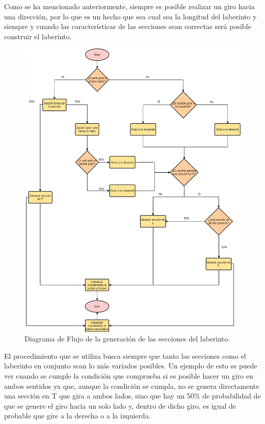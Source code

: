 \documentclass[../main.tex]{subfiles}
\begin{document}
Como se ha mencionado anteriormente, siempre es posible realizar un giro hacia una dirección, por lo que es un hecho que sea cual sea la longitud del laberinto y siempre y cuando las características de las secciones sean correctas será posible construir el laberinto.

\begin{figure}[!p]
\hspace{-1.75cm}
\includegraphics[width=1.3\textwidth]{imagenes/Diagrama_de_Flujo.png}
\caption{Diagrama de Flujo de la generación de las secciones del laberinto.}
\label{fig:Decision_Flowchart}
\vspace{-78.96pt}
\end{figure}

El procedimiento que se utiliza busca siempre que tanto las secciones como el laberinto en conjunto sean lo más variados posibles. Un  ejemplo de esto se puede ver cuando se cumple la condición que comprueba si es posible hacer un giro en ambos sentidos ya que, aunque la condición se cumpla, no se genera directamente una sección en T que gira a ambos lados, sino que hay un 50\% de probabilidad de que se genere el giro hacia un solo lado y, dentro de dicho giro, es igual de probable que gire a la derecha o a la izquierda.
\end{document}
